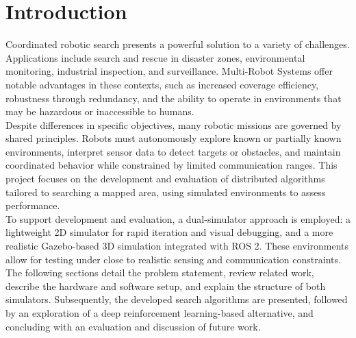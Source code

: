 \section{Introduction}
\label{sec:Introduction}
Coordinated robotic search presents a powerful solution to a variety of challenges.
Applications include search and rescue in disaster zones, environmental monitoring, industrial inspection, and surveillance. 
Multi-Robot Systems offer notable advantages in these contexts, such as increased coverage efficiency, robustness through redundancy, and the ability to operate in environments that may be hazardous or inaccessible to humans.\\

Despite differences in specific objectives, many robotic missions are governed by shared principles. 
Robots must autonomously explore known or partially known environments, interpret sensor data to detect targets or obstacles, and maintain coordinated behavior while constrained by limited communication ranges. 
This project focuses on the development and evaluation of distributed algorithms tailored to searching a mapped area, using simulated environments to assess performance.\\

To support development and evaluation, a dual-simulator approach is employed: a lightweight 2D simulator for rapid iteration and visual debugging, and a more realistic Gazebo-based 3D simulation integrated with ROS 2.
These environments allow for testing under close to realistic sensing and communication constraints.\\

The following sections detail the problem statement, review related work, describe the hardware and software setup, and explain the structure of both simulators. 
Subsequently, the developed search algorithms are presented, followed by an exploration of a deep reinforcement learning-based alternative, and concluding with an evaluation and discussion of future work.
